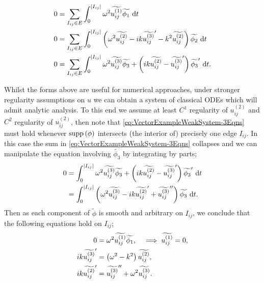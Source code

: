 \begin{subequations} \label{eq:VectorExampleWeakSystem-3Eqns}
	\begin{align}
		0 &= \sum_{I_{ij}\in E} \int_0^{\lvert I_{ij} \rvert} \omega^2\widetilde{u_{ij}^{(1)}}\widetilde{\phi_1} \ \mathrm{d} t \\
		0 &= \sum_{I_{ij}\in E} \int_0^{\lvert I_{ij} \rvert} \left( \omega^2\widetilde{u_{ij}^{(2)}} - ik\widetilde{u_{ij}^{(3)}}' - k^2\widetilde{u_{ij}^{(2)}} \right)\widetilde{\phi_2} \ \mathrm{d} t \\
		0 &= \sum_{I_{ij}\in E} \int_0^{\lvert I_{ij} \rvert} \omega^2\widetilde{u_{ij}^{(3)}}\widetilde{\phi_3} + \left( ik\widetilde{u_{ij}^{(2)}} - \widetilde{u_{ij}^{(3)}}' \right)\widetilde{\phi_3}' \ \mathrm{d} t.
	\end{align}
\end{subequations}

Whilst the forms above are useful for numerical approaches, under stronger regularity assumptions on $u$ we can obtain a system of classical ODEs which will admit analytic analysis.
To this end we assume at least $C^1$ regularity of $u_{ij}^{(2)}$ and $C^2$ regularity of $u_{ij}^{(2)}$, then note that \eqref{eq:VectorExampleWeakSystem-3Eqns} must hold whenever $\mathrm{supp}\left( \phi \right)$ intersects (the interior of) precisely one edge $I_{ij}$.
In this case the sum in \eqref{eq:VectorExampleWeakSystem-3Eqns} collapses and we can manipulate the equation involving $\widetilde{\phi_3}$ by integrating by parts;
\begin{align*}
	0 &= \int_0^{\lvert I_{ij} \rvert} \omega^2\widetilde{u_{ij}^{(3)}}\widetilde{\phi_3} + \left( ik\widetilde{u_{ij}^{(2)}} - \widetilde{u_{ij}^{(3)}}' \right)\widetilde{\phi_3}' \ \mathrm{d} t \\
	&= \int_0^{\lvert I_{ij} \rvert} \left( \omega^2\widetilde{u_{ij}^{(3)}} - ik\widetilde{u_{ij}^{(2)}}' + \widetilde{u_{ij}^{(3)}}'' \right)\widetilde{\phi_3} \ \mathrm{d} t.
\end{align*}
Then as each component of $\widetilde{\phi}$ is smooth and arbitrary on $I_{ij}$, we conclude that the following equations hold on $I_{ij}$;
\begin{align*}
	0 &= \omega^2\widetilde{u_{ij}^{(1)}}\widetilde{\phi_1}, \quad \implies \widetilde{u_{ij}^{(1)}}=0, \\
	ik\widetilde{u_{ij}^{(3)}}' &= \left( \omega^2-k^2 \right)\widetilde{u_{ij}^{(2)}}, \\
	ik\widetilde{u_{ij}^{(2)}}' &= \widetilde{u_{ij}^{(3)}}'' + \omega^2\widetilde{u_{ij}^{(3)}}.
\end{align*}
